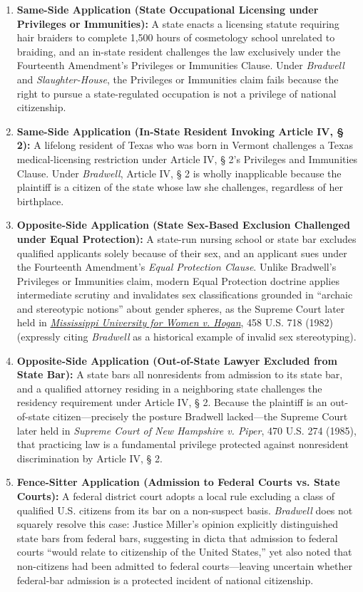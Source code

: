 \documentclass[12pt]{article}
\begin{document}
\begin{enumerate}
  \item \textbf{Same-Side Application (State Occupational Licensing under Privileges or Immunities):} A state enacts a licensing statute requiring hair braiders to complete 1,500 hours of cosmetology school unrelated to braiding, and an in-state resident challenges the law exclusively under the Fourteenth Amendment's Privileges or Immunities Clause. Under \textit{Bradwell} and \textit{Slaughter-House}, the Privileges or Immunities claim fails because the right to pursue a state-regulated occupation is not a privilege of national citizenship.
  \item \textbf{Same-Side Application (In-State Resident Invoking Article IV, \S{} 2):} A lifelong resident of Texas who was born in Vermont challenges a Texas medical-licensing restriction under Article IV, \S{} 2's Privileges and Immunities Clause. Under \textit{Bradwell}, Article IV, \S{} 2 is wholly inapplicable because the plaintiff is a citizen of the state whose law she challenges, regardless of her birthplace.
  \item \textbf{Opposite-Side Application (State Sex-Based Exclusion Challenged under Equal Protection):} A state-run nursing school or state bar excludes qualified applicants solely because of their sex, and an applicant sues under the Fourteenth Amendment's \textit{Equal Protection Clause}. Unlike Bradwell's Privileges or Immunities claim, modern Equal Protection doctrine applies intermediate scrutiny and invalidates sex classifications grounded in ``archaic and stereotypic notions'' about gender spheres, as the Supreme Court later held in \href{https://supreme.justia.com/cases/federal/us/458/718/}{\textit{Mississippi University for Women v. Hogan}}, 458 U.S. 718 (1982) (expressly citing \textit{Bradwell} as a historical example of invalid sex stereotyping).
  \item \textbf{Opposite-Side Application (Out-of-State Lawyer Excluded from State Bar):} A state bars all nonresidents from admission to its state bar, and a qualified attorney residing in a neighboring state challenges the residency requirement under Article IV, \S{} 2. Because the plaintiff is an out-of-state citizen---precisely the posture Bradwell lacked---the Supreme Court later held in \textit{Supreme Court of New Hampshire v. Piper}, 470 U.S. 274 (1985), that practicing law is a fundamental privilege protected against nonresident discrimination by Article IV, \S{} 2.
  \item \textbf{Fence-Sitter Application (Admission to Federal Courts vs. State Courts):} A federal district court adopts a local rule excluding a class of qualified U.S. citizens from its bar on a non-suspect basis. \textit{Bradwell} does not squarely resolve this case: Justice Miller's opinion explicitly distinguished state bars from federal bars, suggesting in dicta that admission to federal courts ``would relate to citizenship of the United States,'' yet also noted that non-citizens had been admitted to federal courts---leaving uncertain whether federal-bar admission is a protected incident of national citizenship.
\end{enumerate}
\end{document}
